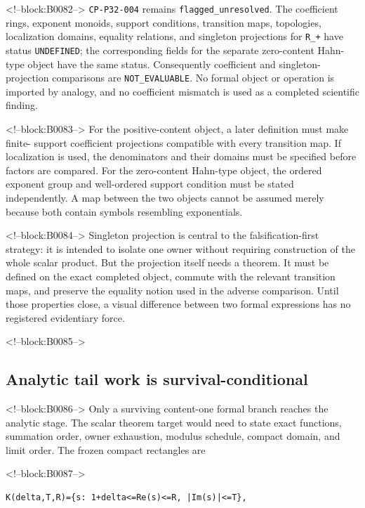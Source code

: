 \documentclass[11pt]{article}
\begin{document}
<!--block:B0082-->
\texttt{CP-P32-004} remains \texttt{flagged\_unresolved}. The coefficient
rings, exponent monoids, support conditions, transition maps, topologies,
localization domains, equality relations, and singleton projections for
\texttt{R\_+} have status \texttt{UNDEFINED}; the corresponding fields for
the separate zero-content Hahn-type object have the same status. Consequently
coefficient and singleton-projection comparisons are
\texttt{NOT\_EVALUABLE}. No formal object or operation is imported by analogy,
and no coefficient mismatch is used as a completed scientific finding.

<!--block:B0083-->
For the positive-content object, a later definition must make finite-
support coefficient projections compatible with every transition map.
If localization is used, the denominators and their domains must be
specified before factors are compared. For the zero-content Hahn-type
object, the ordered exponent group and well-ordered support condition
must be stated independently. A map between the two objects cannot be
assumed merely because both contain symbols resembling exponentials.

<!--block:B0084-->
Singleton projection is central to the falsification-first strategy: it
is intended to isolate one owner without requiring construction of the
whole scalar product. But the projection itself needs a theorem. It
must be defined on the exact completed object, commute with the relevant
transition maps, and preserve the equality notion used in the adverse
comparison. Until those properties close, a visual difference between
two formal expressions has no registered evidentiary force.

<!--block:B0085-->
\hypertarget{46-analytic-tail-work-is-survival-conditional}{%
\subsection{Analytic tail work is
survival-conditional}\label{46-analytic-tail-work-is-survival-conditional}}

<!--block:B0086-->
Only a surviving content-one formal branch reaches the analytic stage.
The scalar theorem target would need to state exact functions, summation
order, owner exhaustion, modulus schedule, compact domain, and limit
order. The frozen compact rectangles are

<!--block:B0087-->
\begin{verbatim}
K(delta,T,R)={s: 1+delta<=Re(s)<=R, |Im(s)|<=T},
\end{verbatim}
\end{document}
